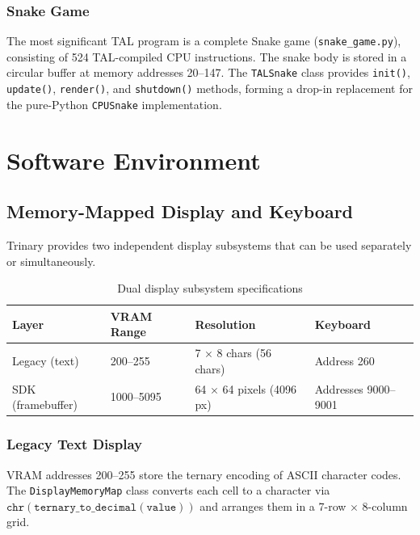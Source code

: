 \documentclass[10pt,a4paper,twoside]{book}
\begin{document}
\section{Snake Game}

The most significant TAL program is a complete Snake game (\texttt{snake\_game.py}),
consisting of 524 TAL-compiled CPU instructions. The snake body is stored in a
circular buffer at memory addresses 20--147. The \texttt{TALSnake} class provides
\texttt{init()}, \texttt{update()}, \texttt{render()}, and \texttt{shutdown()}
methods, forming a drop-in replacement for the pure-Python \texttt{CPUSnake}
implementation.

\part{Software Environment}

\chapter{Memory-Mapped Display and Keyboard}
\label{ch:display}

Trinary provides two independent display subsystems that can be used separately or
simultaneously.

\begin{table}[H]
\centering
\caption{Dual display subsystem specifications}
\label{tab:displays}
\begin{tabular}{llll}
\toprule
Layer & VRAM Range & Resolution & Keyboard \\
\midrule
Legacy (text) & 200--255 & 7 $\times$ 8 chars (56 chars) & Address 260 \\
SDK (framebuffer) & 1000--5095 & 64 $\times$ 64 pixels (4096 px) & Addresses 9000--9001 \\
\bottomrule
\end{tabular}
\end{table}

\section{Legacy Text Display}

VRAM addresses 200--255 store the ternary encoding of ASCII character codes. The
\texttt{DisplayMemoryMap} class converts each cell to a character via
$\texttt{chr}(\texttt{ternary\_to\_decimal}(\texttt{value}))$ and arranges them
in a 7-row $\times$ 8-column grid.
\end{document}
